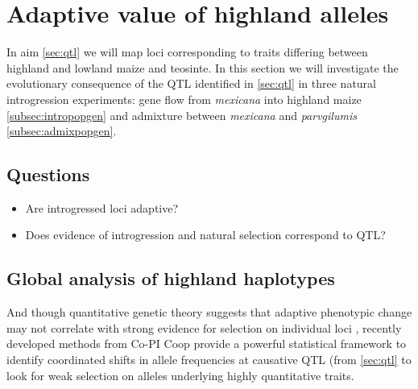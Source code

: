 \section{Adaptive value of highland alleles} \label{sec:selection}

In aim \ref{sec:qtl} we will map loci corresponding to traits differing between highland and lowland maize and teosinte. In this section we will investigate the evolutionary consequence of the QTL identified in \ref{sec:qtl} in three natural introgression experiments: gene flow from \emph{mexicana} into highland maize \ref{subsec:intropopgen} and admixture between \emph{mexicana} and \emph{parvgilumis} \ref{subsec:admixpopgen}. 

\subsection*{Questions}
\begin{itemize}[topsep=0pt,itemsep=-1ex,partopsep=1ex,parsep=1ex]
\item Are introgressed loci adaptive?
\item Does evidence of introgression and natural selection correspond to QTL?
\end{itemize}

\subsection{Global analysis of highland haplotypes} \label{subsec:global}



And though quantitative genetic theory suggests that adaptive phenotypic change may not correlate with strong evidence for selection on individual loci \citep{le2012genetic}, recently developed methods from Co-PI Coop \citep{Berg2013} provide a powerful statistical framework to identify coordinated shifts in allele frequencies at causative QTL (from \ref{sec:qtl} to look for weak selection on alleles underlying highly quantitative traits.  


